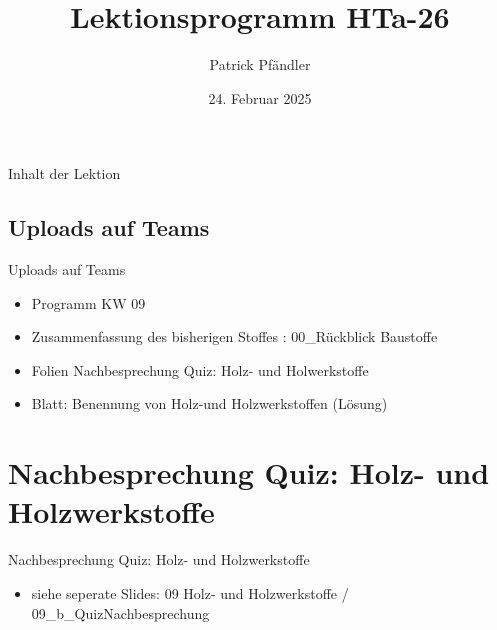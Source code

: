 

\def\customoptions{aspectratio=169} %



\title{\textbf{Lektionsprogramm HTa-26}}
\author{Patrick Pfändler}
\date{24. Februar 2025}



\frame{\titlepage}


\folieFragen
\begin{frame}{Inhalt der Lektion}
	\tableofcontents
\end{frame}

\subsection{Uploads auf Teams}
\begin{frame}{Uploads auf Teams}
	\begin{itemize}
		\item[\textbullet] Programm KW 09
		\item[\textbullet] Zusammenfassung des bisherigen Stoffes : 00\_Rückblick Baustoffe
		\item[\textbullet] Folien Nachbesprechung Quiz: Holz- und Holwerkstoffe
		\item[\textbullet] Blatt: Benennung von Holz-und Holzwerkstoffen (Lösung)
	\end{itemize}
\end{frame}

\section{Nachbesprechung Quiz: Holz- und Holzwerkstoffe}
\BlueSectionSlide
\begin{frame}{Nachbesprechung Quiz: Holz- und Holzwerkstoffe}
	\begin{itemize}
		\item[\textbullet] siehe seperate Slides: 09 Holz- und Holzwerkstoffe / 09\_b\_QuizNachbesprechung
	\end{itemize}
\end{frame}



